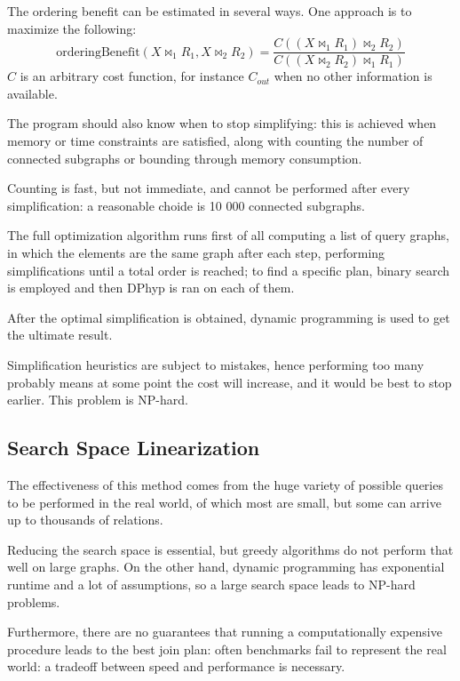 The ordering benefit can be estimated in several ways. One approach is to maximize the following:
$$\text{orderingBenefit}(X \bowtie_1 R_1, X \bowtie_2 R_2) = \frac{C((X \bowtie_1 R_1) \bowtie_2 R_2)}{C((X \bowtie_2 R_2) \bowtie_1 R_1)}$$
$C$ is an arbitrary cost function, for instance $C_{out}$ when no other information is available.

The program should also know when to stop simplifying: this is achieved when memory or time constraints are satisfied, along with counting the number of connected subgraphs or bounding through memory consumption.

Counting is fast, but not immediate, and cannot be performed after every simplification: a reasonable choide is 10 000 connected subgraphs.

The full optimization algorithm runs first of all computing a list of query graphs, in which the elements are the same graph after each step, performing simplifications until a total order is reached; to find a specific plan, binary search is employed and then DPhyp is ran on each of them.

After the optimal simplification is obtained, dynamic programming is used to get the ultimate result.

Simplification heuristics are subject to mistakes, hence performing too many probably means at some point the cost will increase, and it would be best to stop earlier. This problem is NP-hard.

\subsection{Search Space Linearization}
The effectiveness of this method comes from the huge variety of possible queries to be performed in the real world, of which most are small, but some can arrive up to thousands of relations.

Reducing the search space is essential, but greedy algorithms do not perform that well on large graphs. On the other hand, dynamic programming has exponential runtime and a lot of assumptions, so a large search space leads to NP-hard problems. 

Furthermore, there are no guarantees that running a computationally expensive procedure leads to the best join plan: often benchmarks fail to represent the real world: a tradeoff between speed and performance is necessary.

